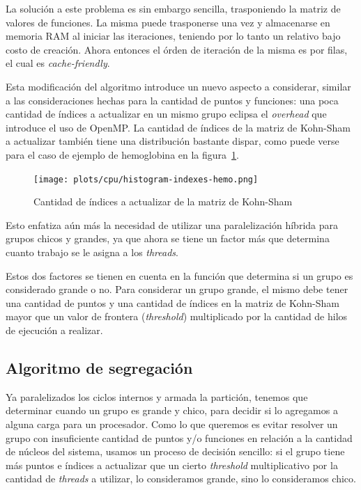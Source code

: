 La soluci\'on a este problema es sin embargo sencilla, trasponiendo la matriz de
valores de funciones. La misma puede trasponerse una vez y almacenarse en memoria
RAM al iniciar las iteraciones, teniendo por lo tanto un relativo bajo costo de
creaci\'on. Ahora entonces el \'orden de iteraci\'on de la misma es por filas, el
cual es \textit{cache-friendly}.

Esta modificaci\'on del algoritmo introduce un nuevo aspecto a considerar, similar
a las consideraciones hechas para la cantidad de puntos y funciones: una poca
cantidad de \'indices a actualizar en un mismo grupo eclipsa el \textit{overhead}
que introduce el uso de OpenMP. La cantidad de \'indices de la matriz de Kohn-Sham a
actualizar tambi\'en tiene una distribuci\'on bastante dispar, como puede verse
para el caso de ejemplo de hemoglobina en la figura~\ref{fig:histogram-indexes-hemo}.

\begin{figure}[htbp]
   \centering
   \texttt{[image: plots/cpu/histogram-indexes-hemo.png]}
   \caption{Cantidad de \'indices a actualizar de la matriz de Kohn-Sham}
   \label{fig:histogram-indexes-hemo}
\end{figure}

Esto enfatiza a\'un m\'as la necesidad de utilizar una paralelizaci\'on h\'ibrida
para grupos chicos y grandes, ya que ahora se tiene un factor m\'as que determina
cuanto trabajo se le asigna a los \textit{threads}.

Estos dos factores se tienen en cuenta en la funci\'on que determina si un grupo
es considerado grande o no. Para considerar un grupo grande, el mismo debe tener
una cantidad de puntos y una cantidad de \'indices en la matriz de Kohn-Sham mayor que
un valor de frontera (\textit{threshold}) multiplicado por la cantidad de hilos de
ejecuci\'on a realizar.

\subsection{Algoritmo de segregaci\'on}

Ya paralelizados los ciclos internos y armada la partici\'on,  tenemos que determinar
cuando un grupo es grande y chico, para
decidir si lo agregamos a alguna carga para un procesador. Como lo que
queremos es evitar resolver un grupo con insuficiente cantidad de puntos y/o
funciones en relaci\'on a la cantidad de n\'ucleos del sistema, usamos un
proceso de decisi\'on sencillo: si el grupo tiene m\'as puntos e \'indices a
actualizar que un cierto \textit{threshold} multiplicativo por la cantidad de
\textit{threads} a utilizar, lo consideramos grande, sino lo consideramos chico.

